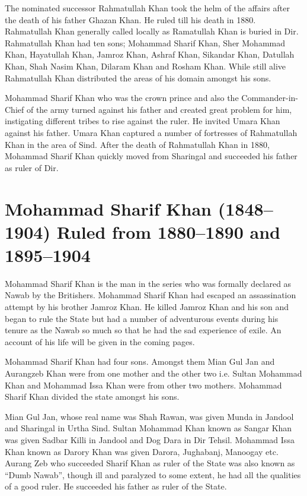\documentclass[twoside,openright]{book}
\begin{document}
The nominated successor Rahmatullah Khan took the helm of the affairs after the
death of his father Ghazan Khan. He ruled till his death in 1880. Rahmatullah
Khan generally called locally as Ramatullah Khan is buried in Dir. Rahmatullah
Khan had ten sons; Mohammad Sharif Khan, Sher Mohammad Khan, Hayatullah Khan,
Jamroz Khan, Ashraf Khan, Sikandar Khan, Datullah Khan, Shah Nasim Khan, Dilaram
Khan and Rosham Khan. While still alive Rahmatullah Khan distributed the areas
of his domain amongst his sons.

Mohammad Sharif Khan who was the crown prince and also the Commander-in-Chief of
the army turned against his father and created great problem for him,
instigating different tribes to rise against the ruler. He invited Umara Khan
against his father. Umara Khan captured a number of fortresses of Rahmatullah
Khan in the area of Sind. After the death of Rahmatullah Khan in 1880, Mohammad
Sharif Khan quickly moved from Sharingal and succeeded his father as ruler of
Dir.

\section{Mohammad Sharif Khan (1848--1904) Ruled from 1880--1890 and 1895--1904}

Mohammad Sharif Khan is the man in the series who was formally declared as Nawab
by the Britishers. Mohammad Sharif Khan had escaped an assassination attempt by
his brother Jamroz Khan. He killed Jamroz Khan and his son and began to rule the
State but had a number of adventurous events during his tenure as the Nawab so
much so that he had the sad experience of exile. An account of his life will be
given in the coming pages.

Mohammad Sharif Khan had four sons. Amongst them Mian Gul Jan and Aurangzeb Khan
were from one mother and the other two i.e. Sultan Mohammad Khan and Mohammad
Issa Khan were from other two mothers. Mohammad Sharif Khan divided the state
amongst his sons.

Mian Gul Jan, whose real name was Shah Rawan, was given Munda in Jandool and
Sharingal in Urtha Sind. Sultan Mohammad Khan known as Sangar Khan was given
Sadbar Killi in Jandool and Dog Dara in Dir Tehsil. Mohammad Issa Khan known as
Darory Khan was given Darora, Jughabanj, Manoogay etc. Aurang Zeb who succeeded
Sharif Khan as ruler of the State was also known as ``Dumb Nawab'', though ill and
paralyzed to some extent, he had all the qualities of a good ruler. He succeeded
his father as ruler of the State.
\end{document}
